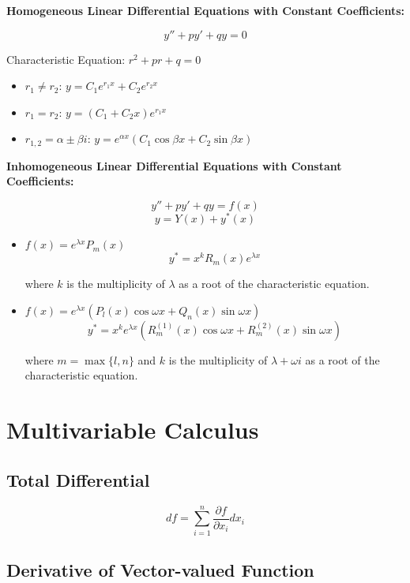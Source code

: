 \documentclass{article}
\begin{document}
\textbf{Homogeneous Linear Differential Equations with Constant Coefficients:}

\[
    y'' + py' + qy = 0
\]

Characteristic Equation: $r^2 + pr + q = 0$

\begin{itemize}
    \item $r_1 \neq r_2$: $y = C_1 e^{r_1 x} + C_2 e^{r_2 x}$
    \item $r_1 = r_2$: $y = (C_1 + C_2 x) e^{r_1 x}$
    \item $r_{1,2} = \alpha \pm \beta i$: $y = e^{\alpha x}(C_1 \cos \beta x + C_2 \sin \beta x)$
\end{itemize}

\textbf{Inhomogeneous Linear Differential Equations with Constant Coefficients:}

\[
    y'' + py' + qy = f(x)
\]
\[
    y = Y(x) + y^*(x)
\]

\begin{itemize}
    \item $f(x) = e^{\lambda x} P_m(x)$
    \[
        y^* = x^k R_m(x) e^{\lambda x}
    \]

    where $k$ is the multiplicity of $\lambda$ as a root of the characteristic equation.

    \item $f(x) = e^{\lambda x}(P_l(x) \cos \omega x + Q_n(x) \sin \omega x)$
    \[
        y^* = x^k e^{\lambda x}(R_m^{(1)}(x) \cos \omega x + R_m^{(2)}(x) \sin \omega x)
    \]

    where $m = \max\{l, n\}$ and $k$ is the multiplicity of $\lambda + \omega i$ as a root of the characteristic equation.
\end{itemize}

\newpage
\section{Multivariable Calculus}

\subsection{Total Differential}

\[
    df = \sum_{i=1}^n \frac{\partial f}{\partial x_i} dx_i
\]

\subsection{Derivative of Vector-valued Function}
\end{document}
